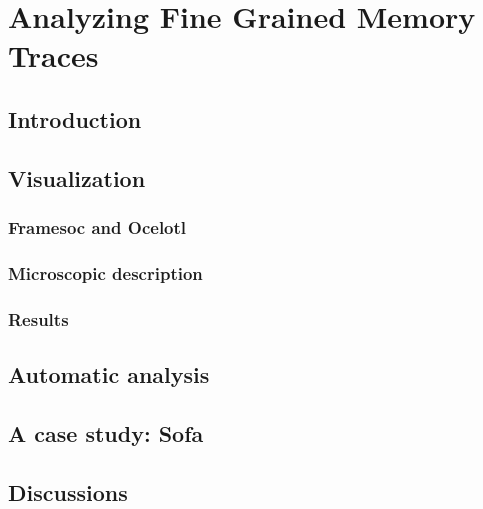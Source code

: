 \chapter{Analyzing Fine Grained Memory Traces}


\section{Introduction}


\section{Visualization}

\subsection{Framesoc and Ocelotl}

\subsection{Microscopic description}

\subsection{Results}

\section{Automatic analysis}


\section{A case study: Sofa}



\section{Discussions}


